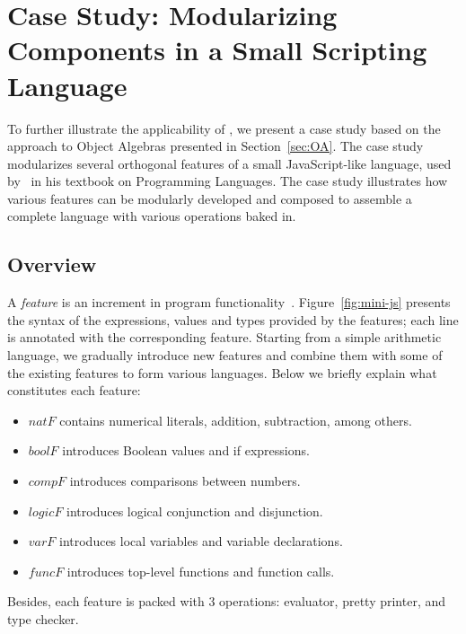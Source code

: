 \section{Case Study: Modularizing Components in a Small Scripting Language}

To further illustrate the applicability of \name, we present a case study based
on the approach to Object Algebras presented in Section~\ref{sec:OA}. The case
study modularizes several orthogonal features of a small
JavaScript-like language, used by~\citet{poplcook} in his textbook
on Programming Languages. The case study illustrates how various features can be
modularly developed and composed to assemble a complete language with
various operations baked in.



\subsection{Overview}

A \textit{feature} is an increment in program
functionality~\citep{zave1999faq,lopez2005evaluating}. Figure~\ref{fig:mini-js}
presents the syntax of the expressions, values and types provided by the
features; each line is annotated with the corresponding feature. Starting from a
simple arithmetic language, we gradually introduce new features and combine them
with some of the existing features to form various languages. Below we briefly
explain what constitutes each feature:
\begin{itemize}
\item $\mathit{natF}$ contains numerical literals, addition, subtraction, among
  others.
\item $\mathit{boolF}$ introduces Boolean values and if expressions.
\item $\mathit{compF}$ introduces comparisons between numbers.
\item $\mathit{logicF}$ introduces logical conjunction and disjunction.
\item $\mathit{varF}$ introduces local variables and variable declarations.
\item $\mathit{funcF}$ introduces top-level functions and function calls.
\end{itemize}
\noindent Besides, each feature is packed with 3 operations: evaluator, pretty
printer, and type checker.

